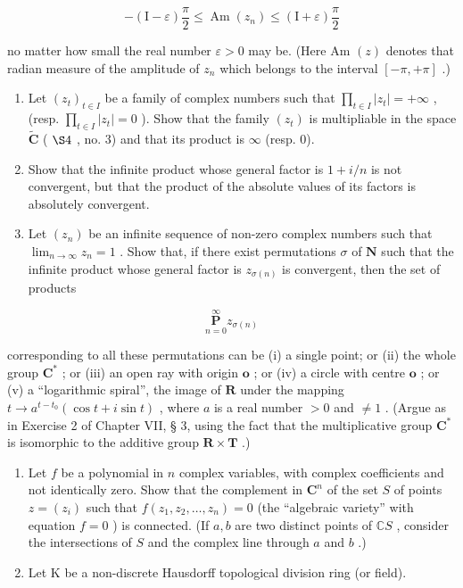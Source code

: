 \[
- (\mathrm{I} - \varepsilon) \frac {\pi}{2} \leqslant \operatorname{Am} (z _ {n}) \leqslant (\mathrm{I} + \varepsilon) \frac {\pi}{2}
\]

no matter how small the real number \(\varepsilon > 0\) may be. (Here Am \((z)\) denotes that radian measure of the amplitude of \(z_{n}\) which belongs to the interval \([- \pi, +\pi]\) .)

\begin{enumerate}
\def\labelenumi{\arabic{enumi})}
\setcounter{enumi}{2}
\item
  Let \((z_{t})_{t\in I}\) be a family of complex numbers such that \(\prod_{t\in I}|z_t| = +\infty\) , (resp. \(\prod_{t\in I}|z_t| = 0\) ). Show that the family \((z_{t})\) is multipliable in the space \(\tilde{\mathbf{C}}\) ( \(\S 4\) , no. 3) and that its product is \(\infty\) (resp. 0).
\item
  Show that the infinite product whose general factor is \(1 + i/n\) is not convergent, but that the product of the absolute values of its factors is absolutely convergent.
\item
  Let \((z_{n})\) be an infinite sequence of non-zero complex numbers such that \(\lim_{n\to \infty}z_n = 1\) . Show that, if there exist permutations \(\sigma\) of \(\mathbf{N}\) such that the infinite product whose general factor is \(z_{\sigma (n)}\) is convergent, then the set of products
\end{enumerate}

\[
\underset {n = 0} {\overset {\infty} {\mathbf {P}}} z _ {\sigma (n)}
\]

corresponding to all these permutations can be (i) a single point; or (ii) the whole group \(\mathbf{C}^*\) ; or (iii) an open ray with origin \(\mathbf{o}\) ; or (iv) a circle with centre \(\mathbf{o}\) ; or (v) a ``logarithmic spiral'', the image of \(\mathbf{R}\) under the mapping \(t \to a^{t - t_0} (\cos t + i \sin t)\) , where \(a\) is a real number \(>0\) and \(\neq 1\) . (Argue as in Exercise 2 of Chapter VII, § 3, using the fact that the multiplicative group \(\mathbf{C}^*\) is isomorphic to the additive group \(\mathbf{R} \times \mathbf{T}\) .)

\ExerciseSection

\begin{enumerate}
\def\labelenumi{\arabic{enumi})}
\item
  Let \(f\) be a polynomial in \(n\) complex variables, with complex coefficients and not identically zero. Show that the complement in \(\mathbf{C}^n\) of the set \(S\) of points \(z = (z_i)\) such that \(f(z_1, z_2, \ldots, z_n) = 0\) (the ``algebraic variety'' with equation \(f = 0\) ) is connected. (If \(a, b\) are two distinct points of \(\mathbb{C}S\) , consider the intersections of \(S\) and the complex line through \(a\) and \(b\) .)
\item
  Let K be a non-discrete Hausdorff topological division ring (or field).
\end{enumerate}

